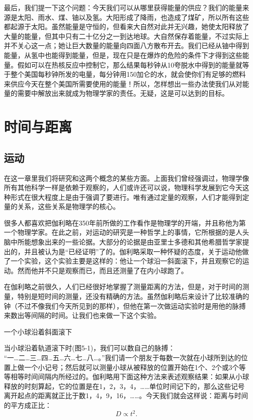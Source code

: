 \documentclass[12pt,oneside]{book}
\begin{document}
最后，我们提一下这个问题：今天我们可以从哪里获得能量的供应？我们的能量来源是太阳、雨水、煤、铀以及氢。大阳形成了降雨，也造成了煤矿，所以所有这些都起源于太阳。虽然能量是守恒的，但看来大自然对此并无兴趣，她使太阳释放了大量的能量，但其中只有二十亿分之一到达地球。大自然保存着能量，不过实际上并不关心这一点；她让巨大数量的能量向四面八方散布开去。我们已经从铀中得到能量，从氢中也能得到能量，但是，现在只是在爆炸的危险的条件下才得到这些能量。假如可以在热核反应中控制它，那么结果每秒钟从10夸脱水中得到的能量就等于整个美国每秒钟所发的电量，每分钟用150加仑的水，就会使你们有足够的燃料来供应今天在整个美国所需要使用的能量！所以，怎样想出一些办法使我们从对能量的需要中解放出来就成为物理学家的责任。无疑，这是可以达到的目标。



\chapter{时间与距离}
\section{运动}
在这一章里我们将研究和这两个概念的某些方面。上面我们曾经强调过，物理学像所有其他科学一样是依赖于观察的，人们或许还可以说，物理科学发展到它今天这种形式在很大程度上是由于强调了要进行。唯有通过定量的观察，人们才能得到定量的关系，这些关系是物理学的核心。

很多人都喜欢把伽利略在350年前所做的工作看作是物理学的开端，并且称他为第一个物理学家。在此之前，对运动的研究是一种哲学上的事情，它所根据的是人头脑中所能想象出来的一些论据。大部分的论据是由亚里士多德和其他希腊哲学家提出的，并且被认为是“已经证明”了的。伽利略采取一种怀疑的态度，关于运动他做了一个实验，这个实验主要是这样的：他让一个球沿一斜面滚下，并且观察它的运动。然而他并不只是观察而已，而且还测量了在内小球跑了。

在伽利略之前很久，人们已经很好地掌握了测量距离的方法，但是，对于时间的测量，特别是短时间的测量，还没有精确的方法。虽然伽利略后来设计了比较准确的钟（不过不像我们今天所见到的那样），但他在第一次做运动实验时是用他的脉搏来数出等间隔的时间。让我们也来做一下这个实验。
\begin{fig}{一个小球沿着斜面滚下}
\caption{一个小球沿着斜面滚下}
\label{fig:一个小球沿着斜面滚下}
\end{fig}
当小球沿着轨道滚下时(图5-1)，我们可以数自己的脉搏：\\“一…二…三…四…五…六…七…八…。”我们请一个朋友于每数一次就在小球所到达的位置上做一个小记号；然后就可以测量小球从被释放的位置开始在1个、2个或3个等等相等时间间隔内所经过的。伽利略用下面这种方法来表述观察结果：如果从小球释放的时刻算起，它的位置是在1，2，3，4，……单位时间记下的，那么这些记号离开起点的距离就正比于数1，4，9，16，……。今天我们就会这样说：距离与时间的平方成正比：
\begin{equation*}
D\propto t^2.
\end{equation*}
\end{document}
